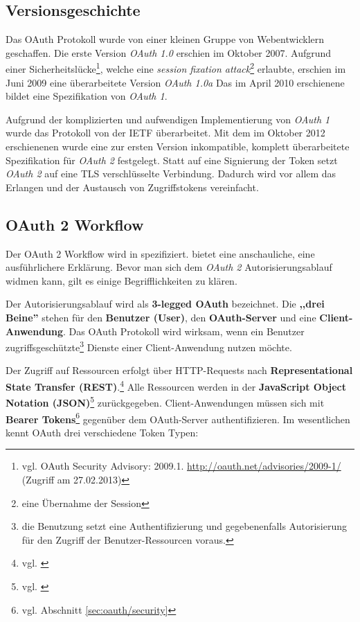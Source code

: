 \documentclass[12pt,a4paper,pointednumbers,abstracton]{scrartcl}
\begin{document}
\subsection{Versionsgeschichte}

Das OAuth Protokoll wurde von einer kleinen Gruppe von Webentwicklern geschaffen.
Die erste Version \emph{OAuth 1.0} erschien im Oktober 2007.
Aufgrund einer Sicherheitslücke\footnote{vgl. OAuth Security Advisory: 2009.1. \url{http://oauth.net/advisories/2009-1/} (Zugriff am 27.02.2013)}, welche eine \emph{session fixation attack}\footnote{eine Übernahme der Session} erlaubte, erschien im Juni 2009 eine überarbeitete Version \emph{OAuth 1.0a}
Das im April 2010 erschienene \cite{RFC5849} bildet eine Spezifikation von \emph{OAuth 1}.

Aufgrund der komplizierten und aufwendigen Implementierung von \emph{OAuth 1} wurde das Protokoll von der IETF überarbeitet.
Mit dem im Oktober 2012 erschienenen \cite{RFC5849} wurde eine zur ersten Version inkompatible, komplett überarbeitete Spezifikation für \emph{OAuth 2} festgelegt. Statt auf eine Signierung der Token setzt \emph{OAuth 2} auf eine TLS verschlüsselte Verbindung.
Dadurch wird vor allem das Erlangen und der Austausch von Zugriffstokens vereinfacht.

\subsection{OAuth 2 Workflow}
\label{sec:oauth2_workflow}

Der OAuth 2 Workflow wird in \cite{RFC5849} spezifiziert.
\cite[Chapter 9]{Leb11} bietet eine anschauliche, \cite{Boy12} eine ausführlichere Erklärung.
Bevor man sich dem \emph{OAuth 2} Autorisierungsablauf widmen kann, gilt es einige Begrifflichkeiten zu klären.

Der Autorisierungsablauf wird als \textbf{3-legged OAuth} bezeichnet.
Die \textbf{,,drei Beine''} stehen für den \textbf{Benutzer (User)}, den \textbf{OAuth-Server} und eine \textbf{Client-Anwendung}.
Das OAuth Protokoll wird wirksam, wenn ein Benutzer zugriffsgeschützte\footnote{die Benutzung setzt eine Authentifizierung und gegebenenfalls Autorisierung für den Zugriff der Benutzer-Ressourcen voraus.} Dienste einer Client-Anwendung nutzen möchte.

Der Zugriff auf Ressourcen erfolgt über HTTP-Requests nach \textbf{Representational State Transfer (REST)}.\footnote{vgl. \cite[Chapter 5]{Fie00}}
Alle Ressourcen werden in der \textbf{JavaScript Object Notation (JSON)}\footnote{vgl. \cite{Cro06}} zurückgegeben.
Client-Anwendungen müssen sich mit \textbf{Bearer Tokens}\footnote{vgl. Abschnitt \ref{sec:oauth/security}} gegenüber dem OAuth-Server authentifizieren.
Im wesentlichen kennt OAuth drei verschiedene Token Typen:
\end{document}
